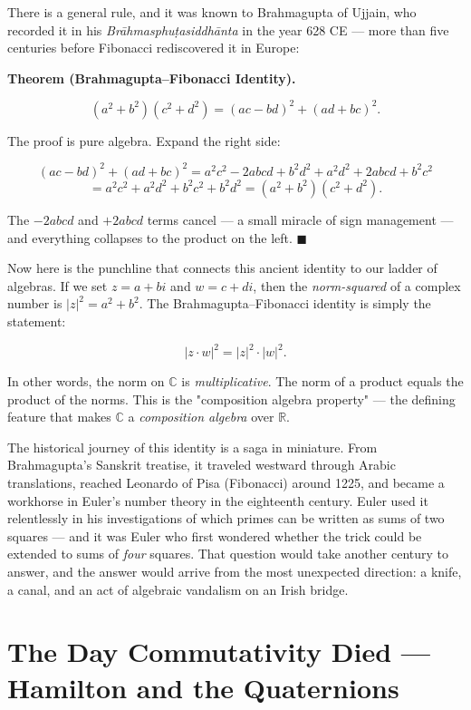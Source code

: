 \documentclass[11pt,twoside,openright]{book}
\theoremstyle{definition}
\theoremstyle{remark}
\begin{document}
There is a general rule, and it was known to Brahmagupta of Ujjain, who recorded it in his \textit{Brāhmasphuṭasiddhānta} in the year 628 CE --- more than five centuries before Fibonacci rediscovered it in Europe:

\textbf{Theorem (Brahmagupta--Fibonacci Identity).}

\[(a^2 + b^2)(c^2 + d^2) = (ac - bd)^2 + (ad + bc)^2.\]

The proof is pure algebra. Expand the right side:

\[(ac - bd)^2 + (ad + bc)^2 = a^2c^2 - 2abcd + b^2d^2 + a^2d^2 + 2abcd + b^2c^2\]
\[= a^2c^2 + a^2d^2 + b^2c^2 + b^2d^2 = (a^2 + b^2)(c^2 + d^2).\]

The $-2abcd$ and $+2abcd$ terms cancel --- a small miracle of sign management --- and everything collapses to the product on the left. $\blacksquare$


Now here is the punchline that connects this ancient identity to our ladder of algebras. If we set $z = a + bi$ and $w = c + di$, then the \textit{norm-squared} of a complex number is $|z|^2 = a^2 + b^2$. The Brahmagupta--Fibonacci identity is simply the statement:

\[|z \cdot w|^2 = |z|^2 \cdot |w|^2.\]

In other words, the norm on $\mathbb{C}$ is \textit{multiplicative}. The norm of a product equals the product of the norms. This is the "composition algebra property" --- the defining feature that makes $\mathbb{C}$ a \textit{composition algebra} over $\mathbb{R}$.

The historical journey of this identity is a saga in miniature. From Brahmagupta's Sanskrit treatise, it traveled westward through Arabic translations, reached Leonardo of Pisa (Fibonacci) around 1225, and became a workhorse in Euler's number theory in the eighteenth century. Euler used it relentlessly in his investigations of which primes can be written as sums of two squares --- and it was Euler who first wondered whether the trick could be extended to sums of \textit{four} squares. That question would take another century to answer, and the answer would arrive from the most unexpected direction: a knife, a canal, and an act of algebraic vandalism on an Irish bridge.


\section{The Day Commutativity Died --- Hamilton and the Quaternions}
\end{document}

